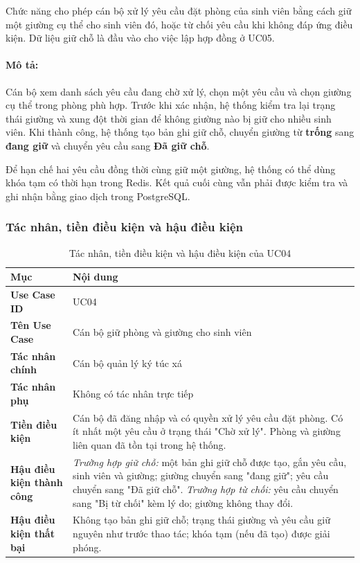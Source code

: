 Chức năng cho phép cán bộ xử lý yêu cầu đặt phòng của sinh viên bằng cách giữ một giường cụ thể cho sinh viên đó, hoặc từ chối yêu cầu khi không đáp ứng điều kiện. Dữ liệu giữ chỗ là đầu vào cho việc lập hợp đồng ở UC05.

\paragraph{Mô tả:}

Cán bộ xem danh sách yêu cầu đang chờ xử lý, chọn một yêu cầu và chọn giường cụ thể trong phòng phù hợp. Trước khi xác nhận, hệ thống kiểm tra lại trạng thái giường và xung đột thời gian để không giường nào bị giữ cho nhiều sinh viên. Khi thành công, hệ thống tạo bản ghi giữ chỗ, chuyển giường từ \textbf{trống} sang \textbf{đang giữ} và chuyển yêu cầu sang \textbf{Đã giữ chỗ}.

Để hạn chế hai yêu cầu đồng thời cùng giữ một giường, hệ thống có thể dùng khóa tạm có thời hạn trong Redis. Kết quả cuối cùng vẫn phải được kiểm tra và ghi nhận bằng giao dịch trong PostgreSQL.

\subsubsection{Tác nhân, tiền điều kiện và hậu điều kiện}

\begin{table}[H]
\centering
\small
\caption{Tác nhân, tiền điều kiện và hậu điều kiện của UC04}
\label{tab:ch2-7}
\begin{tabularx}{\textwidth}{|>{\raggedright\arraybackslash}p{}|>{\raggedright\arraybackslash}X|}
\hline
\textbf{Mục} & \textbf{Nội dung} \\
\hline
\textbf{Use Case ID} & UC04 \\
\hline
\textbf{Tên Use Case} & Cán bộ giữ phòng và giường cho sinh viên \\
\hline
\textbf{Tác nhân chính} & Cán bộ quản lý ký túc xá \\
\hline
\textbf{Tác nhân phụ} & Không có tác nhân trực tiếp \\
\hline
\textbf{Tiền điều kiện} & Cán bộ đã đăng nhập và có quyền xử lý yêu cầu đặt phòng. Có ít nhất một yêu cầu ở trạng thái "Chờ xử lý". Phòng và giường liên quan đã tồn tại trong hệ thống. \\
\hline
\textbf{Hậu điều kiện thành công} & \textit{Trường hợp giữ chỗ:} một bản ghi giữ chỗ được tạo, gắn yêu cầu, sinh viên và giường; giường chuyển sang "đang giữ"; yêu cầu chuyển sang "Đã giữ chỗ". \textit{Trường hợp từ chối:} yêu cầu chuyển sang "Bị từ chối" kèm lý do; giường không thay đổi. \\
\hline
\textbf{Hậu điều kiện thất bại} & Không tạo bản ghi giữ chỗ; trạng thái giường và yêu cầu giữ nguyên như trước thao tác; khóa tạm (nếu đã tạo) được giải phóng. \\
\hline
\end{tabularx}
\end{table}

